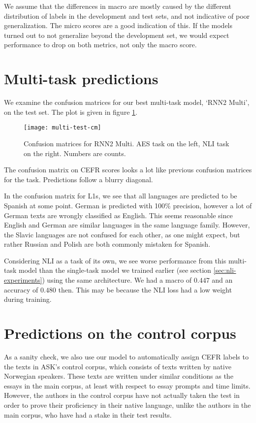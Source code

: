 We assume that the differences in macro \FI are mostly caused by the
different distribution of labels in the development and test sets, and not
indicative of poor generalization. The micro \FI scores are a good indication
of this. If the models turned out to not generalize beyond the development
set, we would expect performance to drop on both metrics, not only the macro
\FI score.


\section{Multi-task predictions}

We examine the confusion matrices for our best multi-task model, `RNN2 Multi',
on the test set. The plot is given in figure \ref{fig:multi-test-cm}.

\begin{figure}
  \centering
  \texttt{[image: multi-test-cm]}
  
  \caption[Multi-task confusion matrices]{
    Confusion matrices for RNN2 Multi. \ac{AES} task on the left, \ac{NLI}
    task on the right. Numbers are counts.
  }
  \label{fig:multi-test-cm}
\end{figure}

The confusion matrix on CEFR scores looks a lot like previous confusion matrices
for the task. Predictions follow a blurry diagonal.

In the confusion matrix for \acp{L1}, we see that all languages are predicted
to be Spanish at some point. German is predicted with 100\% precision,
however a lot of German texts are wrongly classified as English. This seems
reasonable since English and German are similar languages in the same
language family. However, the Slavic languages are not confused for each
other, as one might expect, but rather Russian and Polish are both commonly
mistaken for Spanish.

Considering \ac{NLI} as a task of its own, we see worse performance from this
multi-task model than the single-task model we trained earlier (see section
\ref{sec:nli-experiments}) using the same architecture. We had a macro \FI of
$0.447$ and an accuracy of $0.480$ then. This
may be because the NLI loss had a low weight during training.


\section{Predictions on the control corpus}

As a sanity check, we also use our model to automatically assign CEFR labels
to the texts in ASK's control corpus, which consists of texts written by
native Norwegian speakers. These texts are written under similar conditions as
the essays in the main corpus, at least with respect to essay prompts and time
limits. However, the authors in the control corpus have not actually taken the
test in order to prove their proficiency in their native language, unlike the
authors in the main corpus, who have had a stake in their test results.

